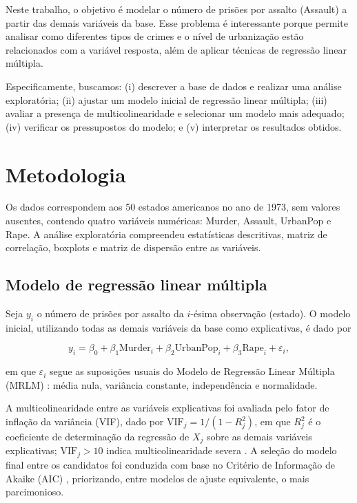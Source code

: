 \documentclass[a4paper]{modeloUFCG} %
\begin{document}
Neste trabalho, o objetivo é modelar o número de prisões por assalto (Assault) a partir das demais variáveis da base. Esse
problema é interessante porque permite analisar como diferentes tipos de crimes e o nível de urbanização estão relacionados com a
variável resposta, além de aplicar técnicas de regressão linear múltipla.

Especificamente, buscamos:
(i) descrever a base de dados e realizar uma análise exploratória;
(ii) ajustar um modelo inicial de regressão linear múltipla;
(iii) avaliar a presença de multicolinearidade e selecionar um modelo mais adequado;
(iv) verificar os pressupostos do modelo; e
(v) interpretar os resultados obtidos.

\section{Metodologia}\label{metodologia}

Os dados correspondem aos 50 estados americanos no ano de 1973, sem valores ausentes, contendo quatro variáveis numéricas:
Murder, Assault, UrbanPop e Rape. A análise exploratória compreendeu estatísticas descritivas, matriz de correlação, boxplots
e matriz de dispersão entre as variáveis.

\subsection{Modelo de regressão linear múltipla}\label{modelo-de-regressuxe3o-linear-muxfaltipla}

Seja \(y_i\) o número de prisões por assalto da \(i\)-ésima observação (estado). O modelo inicial, utilizando todas as demais variáveis
da base como explicativas, é dado por

\[
y_i = \beta_0 + \beta_1 \text{Murder}_i + \beta_2 \text{UrbanPop}_i + \beta_3 \text{Rape}_i + \varepsilon_i,
\]

\noindent em que \(\varepsilon_i\) segue as suposições usuais do Modelo de Regressão Linear Múltipla (MRLM) \cite{Kutner2004}: média nula,
variância constante, independência e normalidade.

A multicolinearidade entre as variáveis explicativas foi avaliada pelo fator de inflação da variância (VIF), dado por
\(\text{VIF}_j = 1/(1 - R^2_j)\), em que \(R^2_j\) é o coeficiente de determinação da regressão de \(X_j\) sobre as demais variáveis explicativas;
\(\text{VIF}_j > 10\) indica multicolinearidade severa \cite{Kutner2004}. A seleção do modelo final entre os candidatos foi conduzida com base
no Critério de Informação de Akaike (AIC) \cite{Akaike1974}, priorizando, entre modelos de ajuste equivalente, o mais parcimonioso.
\end{document}
